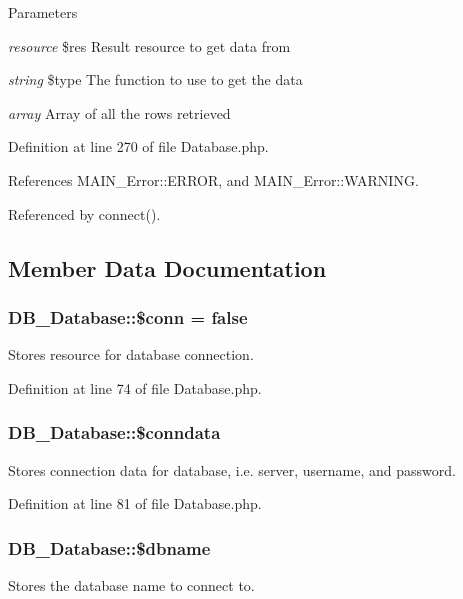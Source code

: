 \begin{DoxyParams}{Parameters}
\item[{\em resource}]\$res Result resource to get data from \item[{\em string}]\$type The function to use to get the data\item[{\em array}]Array of all the rows retrieved \end{DoxyParams}


Definition at line 270 of file Database.php.

References MAIN\_\-Error::ERROR, and MAIN\_\-Error::WARNING.

Referenced by connect().

\subsection{Member Data Documentation}
\hypertarget{classDB__Database_a8cc2ee198b44ecef38ffaaef255bee93}{
\subsubsection[{\$conn}]{\setlength{\rightskip}{0pt plus 5cm}DB\_\-Database::\$conn = false}}
\label{d3/d63/classDB__Database_a8cc2ee198b44ecef38ffaaef255bee93}
Stores resource for database connection. 

Definition at line 74 of file Database.php.\hypertarget{classDB__Database_a052600d78f57d7af178e13ab7992949a}{
\subsubsection[{\$conndata}]{\setlength{\rightskip}{0pt plus 5cm}DB\_\-Database::\$conndata}}
\label{d3/d63/classDB__Database_a052600d78f57d7af178e13ab7992949a}
Stores connection data for database, i.e. server, username, and password. 

Definition at line 81 of file Database.php.\hypertarget{classDB__Database_accd8f5296560fb4ce0cc8aa294b3951e}{
\subsubsection[{\$dbname}]{\setlength{\rightskip}{0pt plus 5cm}DB\_\-Database::\$dbname}}
\label{d3/d63/classDB__Database_accd8f5296560fb4ce0cc8aa294b3951e}
Stores the database name to connect to. 

